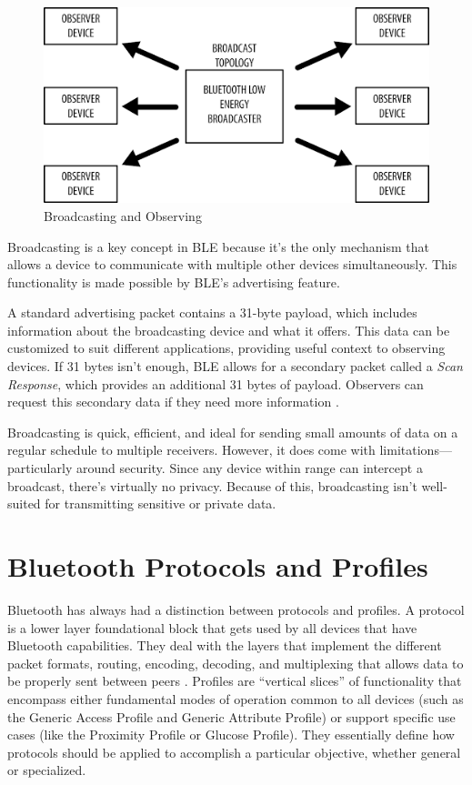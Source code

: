 \begin{figure}[h]
    \caption{Broadcasting and Observing}
    \includegraphics{broadcastobserve.png}
    \end{figure}

Broadcasting is a key concept in BLE because it’s the only mechanism that allows a device to communicate with multiple other devices simultaneously. This functionality is made possible by BLE’s advertising feature.

A standard advertising packet contains a 31-byte payload, which includes information about the broadcasting device and what it offers. This data can be customized to suit different applications, providing useful context to observing devices. If 31 bytes isn’t enough, BLE allows for a secondary packet called a \textit{Scan Response}, which provides an additional 31 bytes of payload. Observers can request this secondary data if they need more information \cite{gettingstartedwble}.

Broadcasting is quick, efficient, and ideal for sending small amounts of data on a regular schedule to multiple receivers. However, it does come with limitations—particularly around security. Since any device within range can intercept a broadcast, there’s virtually no privacy. Because of this, broadcasting isn’t well-suited for transmitting sensitive or private data.
\section{Bluetooth Protocols and Profiles}

Bluetooth has always had a distinction between protocols and profiles. A protocol is a lower layer foundational block that gets used by all devices that have Bluetooth capabilities. They deal with the layers that implement the different packet formats, routing, encoding, decoding, and multiplexing that allows data to be properly sent between peers \cite{gettingstartedwble}. Profiles are ``vertical slices'' of functionality that encompass either fundamental modes of operation common to all devices (such as the Generic Access Profile and Generic Attribute Profile) or support specific use cases (like the Proximity Profile or Glucose Profile). They essentially define how protocols should be applied to accomplish a particular objective, whether general or specialized.

